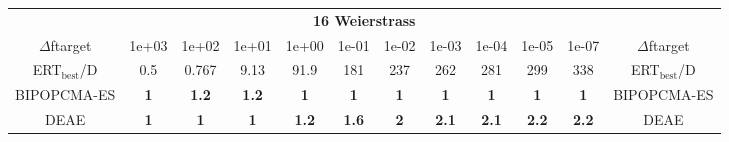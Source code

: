 \begin{tabular}{cccccccccccc}
 & \multicolumn{10}{c}{{\normalsize \textbf{16 Weierstrass}}}\\
$\Delta$ftarget& 1e+03& 1e+02& 1e+01& 1e+00& 1e-01& 1e-02& 1e-03& 1e-04& 1e-05& 1e-07 & $\Delta$ftarget \\
ERT$_{\textrm{best}}$/D& 0.5& 0.767& 9.13& 91.9& 181& 237& 262& 281& 299& 338 & ERT$_{\textrm{best}}$/D \\
\hline
BIPOPCMA-ES & \textbf{1} & \textbf{1.2} & \textbf{1.2} & \textbf{1} & \textbf{1} & \textbf{1} & \textbf{1} & \textbf{1} & \textbf{1} & \textbf{1} & BIPOPCMA-ES \cite{add_an_entry_for_BIPOPCMA-ES_in_bbob.bib}\\
DEAE & \textbf{1} & \textbf{1} & \textbf{1} & \textbf{1.2} & \textbf{1.6} & \textbf{2} & \textbf{2.1} & \textbf{2.1} & \textbf{2.2} & \textbf{2.2} & DEAE \cite{add_an_entry_for_DEAE_in_bbob.bib}
\end{tabular}
